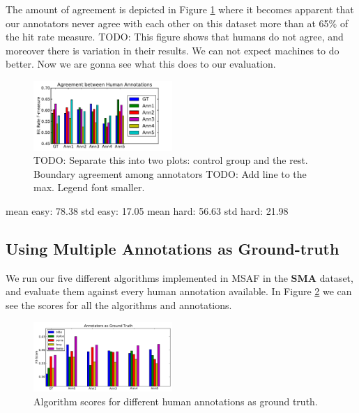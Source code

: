 \documentclass{article}
\begin{document}
The amount of agreement is depicted in Figure \ref{fig:human-agreement} where it becomes apparent that our annotators never agree with each other on this dataset more than at 65\% of the hit rate measure.
TODO: This figure shows that humans do not agree, and moreover there is variation in their results.
We can not expect machines to do better.
Now we are gonna see what this does to our evaluation.

\begin{figure}
  \centering
  \includegraphics[width=0.47\textwidth]{plots/human-agreement.pdf}
  \caption{TODO: Separate this into two plots: control group and the rest. Boundary agreement among annotators TODO: Add line to the max. Legend font smaller.}
  \label{fig:human-agreement}
\end{figure}%

mean easy: 78.38
std easy: 17.05
mean hard: 56.63
std hard: 21.98


\subsection{Using Multiple Annotations as Ground-truth}

We run our five different algorithms implemented in MSAF in the \textbf{SMA} dataset, and evaluate them against every human annotation available.
In Figure \ref{fig:annotatorsAsGT} we can see the scores for all the algorithms and annotations.

\begin{figure}
  \centering
  \includegraphics[width=0.47\textwidth]{plots/AnnotatorsAsGT.pdf}
  \caption{Algorithm scores for different human annotations as ground truth.}
  \label{fig:annotatorsAsGT}
\end{figure}%
\end{document}
